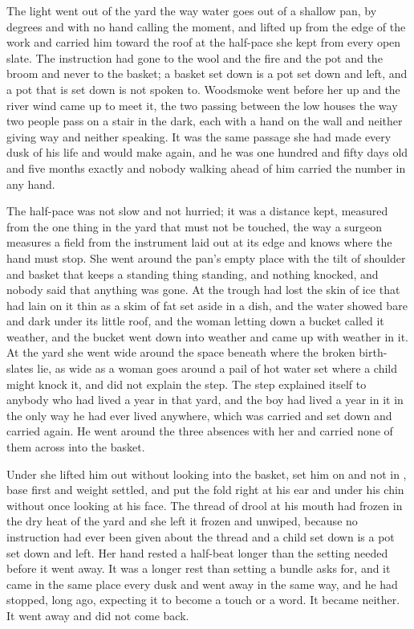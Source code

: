 The light went out of the yard the way water goes out of a shallow pan, by degrees and with no hand calling the moment, and  lifted  up from the edge of the work and carried him toward the roof at the half-pace she kept from every open slate. The instruction had gone to the wool and the fire and the pot and the broom and never to the basket; a basket set down is a pot set down and left, and a pot that is set down is not spoken to. Woodsmoke went before her up  and the river wind came up to meet it, the two passing between the low houses the way two people pass on a stair in the dark, each with a hand on the wall and neither giving way and neither speaking. It was the same passage she had made every dusk of his life and would make again, and he was one hundred and fifty days old and five months exactly and nobody walking ahead of him carried the number in any hand.

The half-pace was not slow and not hurried; it was a distance kept, measured from the one thing in the yard that must not be touched, the way a surgeon measures a field from the instrument laid out at its edge and knows where the hand must stop. She went around the pan's empty place with the tilt of shoulder and basket that keeps a standing thing standing, and nothing knocked, and nobody said that anything was gone. At  the trough had lost the skin of ice that had lain on it thin as a skim of fat set aside in a dish, and the water showed bare and dark under its little roof, and the woman letting down a bucket called it weather, and the bucket went down into weather and came up with weather in it. At the yard she went wide around the space beneath  where the broken birth-slates lie, as wide as a woman goes around a pail of hot water set where a child might knock it, and did not explain the step. The step explained itself to anybody who had lived a year in that yard, and the boy had lived a year in it in the only way he had ever lived anywhere, which was carried and set down and carried again. He went around the three absences with her and carried none of them across into the basket.

Under  she lifted him out without looking into the basket, set him on  and not in , base first and weight settled, and put the fold right at his ear and under his chin without once looking at his face. The thread of drool at his mouth had frozen in the dry heat of the yard and she left it frozen and unwiped, because no instruction had ever been given about the thread and a child set down is a pot set down and left. Her hand rested a half-beat longer than the setting needed before it went away. It was a longer rest than setting a bundle asks for, and it came in the same place every dusk and went away in the same way, and he had stopped, long ago, expecting it to become a touch or a word. It became neither. It went away and did not come back.

